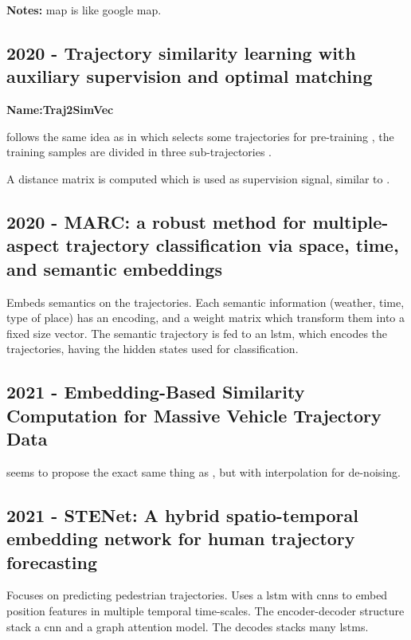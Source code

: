 \textbf{Notes:} map is like google map.

\subsection*{2020 - Trajectory similarity learning with auxiliary supervision and optimal matching}

\textbf{Name:Traj2SimVec}

\cite{zhang2020trajectory} follows the same idea as in \cite{yao2019computing} which selects some trajectories for pre-training , the training samples are divided in three sub-trajectories .

A distance matrix is computed which is used as supervision signal, similar to \cite{yao2019computing}.

\subsection*{2020 - MARC: a robust method for multiple-aspect trajectory classification via space, time, and semantic embeddings}

\cite{may2020marc} Embeds semantics on the trajectories. Each semantic information (weather, time, type of place) has an encoding, and a weight matrix which transform them into a fixed size vector. The semantic trajectory is fed to an \gls{lstm}, which encodes the trajectories, having the hidden states used for classification.

\subsection*{2021 - Embedding-Based Similarity Computation for Massive Vehicle Trajectory Data}

\cite{chen2021embedding} seems to propose the exact same thing as \cite{yao2019computing}, but with interpolation for de-noising.

\subsection*{2021 - STENet: A hybrid spatio-temporal embedding network for human trajectory forecasting}

\cite{zhang2021stenet} Focuses on predicting pedestrian trajectories. Uses a \gls{lstm} with \glspl{cnn} to embed position features in multiple temporal time-scales. The encoder-decoder structure stack a \gls{cnn} and a graph attention model. The decodes stacks many \glspl{lstm}. 

